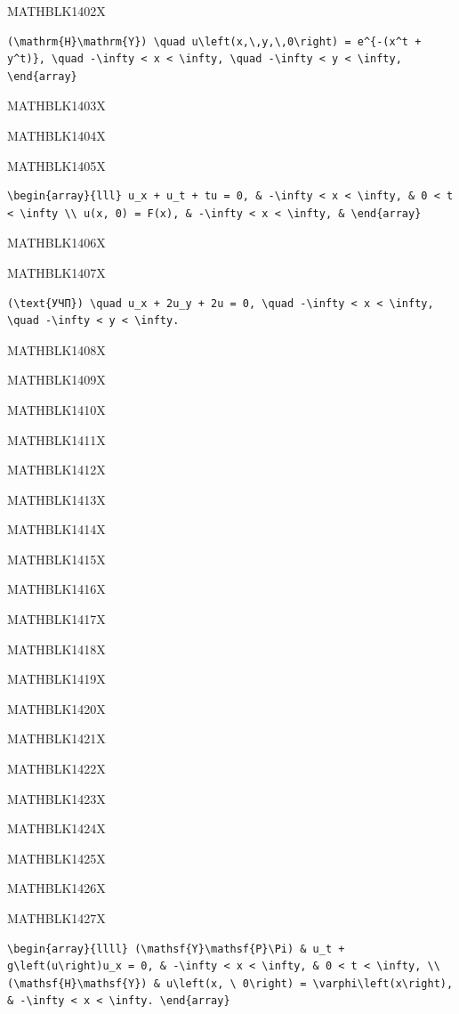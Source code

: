 \documentclass[
  ukrainian,
]{article}
\begin{document}
MATHBLK1402X

\begin{verbatim}
(\mathrm{H}\mathrm{Y}) \quad u\left(x,\,y,\,0\right) = e^{-(x^t + y^t)}, \quad -\infty < x < \infty, \quad -\infty < y < \infty, \end{array}
\end{verbatim}

MATHBLK1403X

MATHBLK1404X

MATHBLK1405X

\begin{verbatim}
\begin{array}{lll} u_x + u_t + tu = 0, & -\infty < x < \infty, & 0 < t < \infty \\ u(x, 0) = F(x), & -\infty < x < \infty, & \end{array}
\end{verbatim}

MATHBLK1406X

MATHBLK1407X

\begin{verbatim}
(\text{УЧП}) \quad u_x + 2u_y + 2u = 0, \quad -\infty < x < \infty, \quad -\infty < y < \infty.
\end{verbatim}

MATHBLK1408X

MATHBLK1409X

MATHBLK1410X

MATHBLK1411X

MATHBLK1412X

MATHBLK1413X

MATHBLK1414X

MATHBLK1415X

MATHBLK1416X

MATHBLK1417X

MATHBLK1418X

MATHBLK1419X

MATHBLK1420X

MATHBLK1421X

MATHBLK1422X

MATHBLK1423X

MATHBLK1424X

MATHBLK1425X

MATHBLK1426X

MATHBLK1427X

\begin{verbatim}
\begin{array}{llll} (\mathsf{Y}\mathsf{P}\Pi) & u_t + g\left(u\right)u_x = 0, & -\infty < x < \infty, & 0 < t < \infty, \\ (\mathsf{H}\mathsf{Y}) & u\left(x, \ 0\right) = \varphi\left(x\right), & -\infty < x < \infty. \end{array}
\end{verbatim}
\end{document}
